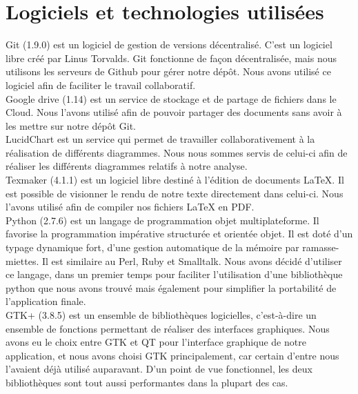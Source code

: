 \documentclass[16pts]{report}
\begin{document}
    \section{Logiciels et technologies utilisées}
    \label{sec:Logiciels et technologies utilisées}

Git (1.9.0) est un logiciel de gestion de versions décentralisé.
C'est un logiciel libre créé par Linus Torvalds.
Git fonctionne de façon décentralisée, mais nous utilisons les serveurs de 
Github pour gérer notre dépôt.
Nous avons utilisé ce logiciel afin de faciliter le travail collaboratif.
\\

Google drive (1.14) est un service de stockage et de partage de fichiers 
dans le Cloud. Nous l'avons utilisé afin de pouvoir partager des documents 
sans avoir à les mettre sur notre dépôt Git. 
\\

LucidChart est un service qui permet de travailler collaborativement à la 
réalisation de différents diagrammes. Nous nous sommes servis de celui-ci 
afin de réaliser les différents diagrammes relatifs à notre analyse.
\\

Texmaker (4.1.1) est un logiciel libre destiné à l'édition de documents 
LaTeX. Il est possible de visionner le rendu de notre texte directement dans 
celui-ci. Nous l'avons utilisé afin de compiler nos fichiers LaTeX en PDF.
\\

Python (2.7.6) est un langage de programmation objet multiplateforme. 
Il favorise la programmation impérative structurée et orientée objet. Il 
est doté d'un typage dynamique fort, d'une gestion automatique de la 
mémoire par ramasse-miettes. Il est similaire au Perl, Ruby et Smalltalk. 
Nous avons décidé d'utiliser ce langage, dans un premier temps pour 
faciliter l'utilisation d'une bibliothèque python que nous avons trouvé 
mais également pour simplifier la portabilité de l'application finale.
\\

GTK+ (3.8.5) est un ensemble de bibliothèques logicielles, c'est-à-dire 
un ensemble de fonctions permettant de réaliser des interfaces graphiques. 
Nous avons eu le choix entre GTK et QT pour l'interface graphique de notre 
application, et nous avons choisi GTK principalement, car certain 
d'entre nous l'avaient déjà utilisé auparavant. D'un point de vue 
fonctionnel, les deux bibliothèques sont tout aussi performantes dans 
la plupart des cas.
\\
\end{document}
